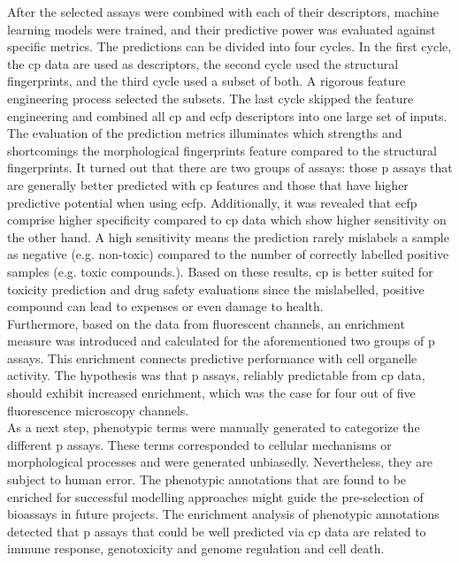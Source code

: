 After the selected assays were combined with each of their descriptors, machine learning models were trained, and their predictive power was evaluated against specific metrics. The predictions can be divided into four cycles. In the first cycle, the \ac{cp} data are used as descriptors, the second cycle used the structural fingerprints, and the third cycle used a subset of both. A rigorous feature engineering process selected the subsets. The last cycle skipped the feature engineering and combined all \ac{cp} and \ac{ecfp} descriptors into one large set of inputs.\\
The evaluation of the prediction metrics illuminates which strengths and shortcomings the morphological fingerprints feature compared to the structural fingerprints. It turned out that there are two groups of assays: those \acl{p} assays that are generally better predicted with \ac{cp} features and those that have higher predictive potential when using \ac{ecfp}. Additionally, it was revealed that \ac{ecfp} comprise higher specificity compared to \ac{cp} data which show higher sensitivity on the other hand. A high sensitivity means the prediction rarely mislabels a sample as negative (e.g. non-toxic) compared to the number of correctly labelled positive samples (e.g. toxic compounds.). Based on these results, \ac{cp} is better suited for toxicity prediction and drug safety evaluations since the mislabelled, positive compound can lead to expenses or even damage to health.\\
Furthermore, based on the data from fluorescent channels, an enrichment measure was introduced and calculated for the aforementioned two groups of \acl{p} assays. This enrichment connects predictive performance with cell organelle activity. The hypothesis was that \acl{p} assays, reliably predictable from \ac{cp} data, should exhibit increased enrichment, which was the case for four out of five fluorescence microscopy channels.\\
As a next step, phenotypic terms were manually generated to categorize the different \acl{p} assays. These terms corresponded to cellular mechanisms or morphological processes and were generated unbiasedly. Nevertheless, they are subject to human error. The phenotypic annotations that are found to be enriched for successful modelling approaches might guide the pre-selection of bioassays in future projects. The enrichment analysis of phenotypic annotations detected that \acl{p} assays that could be well predicted via \ac{cp} data are related to immune response, genotoxicity and genome regulation and cell death.\\
